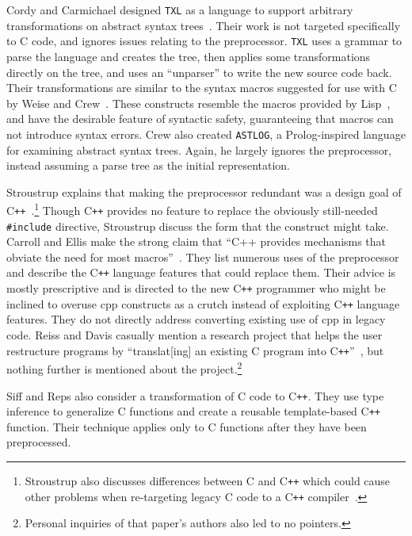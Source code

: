 \documentclass{article}
\newcommand{\Cpp}{\mbox{\textsf{cpp}}}
\newcommand{\CPP}{\mbox{C\texttt{++}}}
\newcommand{\C}{\mbox{C}}
\newcommand{\ppd}[1]{\texttt{\##1}}
\begin{document}
Cordy and Carmichael designed \texttt{TXL} as a language to support
arbitrary transformations on abstract syntax trees~\cite{TXL}.  Their
work is not targeted specifically to \C{} code, and ignores issues
relating to the preprocessor.  \texttt{TXL} uses a grammar to parse the
language and creates the tree, then applies some transformations
directly on the tree, and uses an ``unparser'' to write the new source
code back.  Their transformations are similar to the syntax macros
suggested for use with \C{} by Weise and Crew~\cite{Weise93}.  These
constructs resemble the macros provided by Lisp~\cite{Steele90}, and
have the desirable feature of syntactic safety, guaranteeing that macros can
not introduce syntax errors. Crew also created \texttt{ASTLOG}, a
\textsf{Prolog}-inspired language for examining abstract syntax trees.
Again, he largely ignores the preprocessor, instead assuming a parse
tree as the initial representation.

Stroustrup explains that making the preprocessor redundant was a design
goal of \CPP{}~\cite[p.~424]{Stroustrup94}.\footnote{Stroustrup also
  discusses differences between \C{} and \CPP{} which could cause other
  problems when re-targeting legacy \C{} code to a \CPP{}
  compiler~\cite[p.~816-820]{Stroustrup97}.} Though \CPP{} provides no
feature to replace the obviously still-needed \ppd{include} directive,
Stroustrup discuss the form that the construct might take.  Carroll and
Ellis make the strong claim that ``C++ provides mechanisms that obviate
the need for most macros''~\cite[p.~147]{Carroll95}.  They list numerous
uses of the preprocessor and describe the \CPP{} language features that
could replace them.  Their advice is mostly prescriptive and is directed
to the new \CPP{} programmer who might be inclined to overuse \Cpp{}
constructs as a crutch instead of exploiting \CPP{} language features.
They do not directly address converting existing use of \Cpp{} in legacy
code.  Reiss and Davis casually mention a research project that helps
the user restructure programs by ``translat[ing] an existing \C{}
program into \CPP{}''~\cite[p.~2]{Reiss95}, but nothing further is
mentioned about the project.\footnote{Personal inquiries of that paper's
  authors also led to no pointers.}

Siff and Reps also consider a transformation of \C{} code to \CPP{}.
They use type inference to generalize \C{} functions and create a
reusable template-based \CPP{} function.  Their technique applies only
to  \C{} functions after they have been preprocessed.
\end{document}
